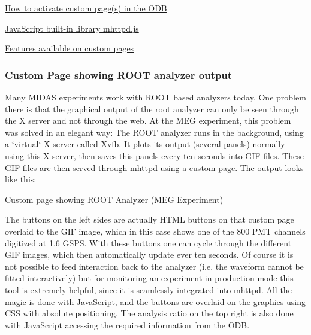 \begin{DoxyItemize}
\item \hyperlink{RC_mhttpd_Activate}{How to activate custom page(s) in the ODB}
\item \hyperlink{RC_mhttpd_custom_js_lib}{JavaScript built-\/in library mhttpd.js}
\item \hyperlink{RC_mhttpd_custom_features}{Features available on custom pages}
\end{DoxyItemize}

\par
 \par
 \label{index_end}
\hypertarget{index_end}{}


 \subsubsection{Custom Page showing ROOT analyzer output}\label{RC_ROOT_analyzer_page}
\label{RC_ROOT_analyzer_page_idx_mhttpd_page_custom_examples_ROOT}
\hypertarget{RC_ROOT_analyzer_page_idx_mhttpd_page_custom_examples_ROOT}{}
 \par
 

Many MIDAS experiments work with ROOT based analyzers today. One problem there is that the graphical output of the root analyzer can only be seen through the X server and not through the web. At the MEG experiment, this problem was solved in an elegant way: The ROOT analyzer runs in the background, using a \char`\"{}virtual\char`\"{} X server called Xvfb. It plots its output (several panels) normally using this X server, then saves this panels every ten seconds into GIF files. These GIF files are then served through mhttpd using a custom page. The output looks like this:

\par
 \begin{center} Custom page showing ROOT Analyzer (MEG Experiment)  \end{center}  \par
 The buttons on the left sides are actually HTML buttons on that custom page overlaid to the GIF image, which in this case shows one of the 800 PMT channels digitized at 1.6 GSPS. With these buttons one can cycle through the different GIF images, which then automatically update ever ten seconds. Of course it is not possible to feed interaction back to the analyzer (i.e. the waveform cannot be fitted interactively) but for monitoring an experiment in production mode this tool is extremely helpful, since it is seamlessly integrated into mhttpd. All the magic is done with JavaScript, and the buttons are overlaid on the graphics using CSS with absolute positioning. The analysis ratio on the top right is also done with JavaScript accessing the required information from the ODB. \par


